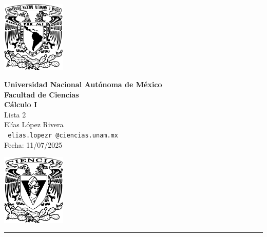 \documentclass[11pt,letterpaper]{article}
\begin{document}

\begin{center}
    \begin{minipage}{3cm}
    	\begin{center}
    		\includegraphics[height=3.4cm]{logo_unam.png}
    	\end{center}
    \end{minipage}\hfill
    \begin{minipage}{10cm}
    	\begin{center}
    	\textbf{\large Universidad Nacional Autónoma de México}\\[0.1cm]
        \textbf{Facultad de Ciencias}\\[0.1cm]
        \textbf{C\'alculo I}\\[0.1cm]
        Lista 2\\[0.1cm]
         El\'ias L\'opez Rivera\\[0.1cm]
        \texttt{ elias.lopezr\,@ciencias.unam.mx }\\[0.1cm]
        Fecha:\,\,11/07/2025
    	\end{center}
    \end{minipage}\hfill
    \begin{minipage}{3cm}
    	\begin{center}
    		\includegraphics[height=3.4cm]{Logo_FC.png}
    	\end{center}
    \end{minipage}
\end{center}

\rule{17cm}{0.1mm}
\end{document}
